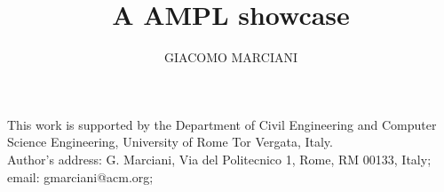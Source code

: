 \documentclass[acmutv-cw-ombd]{acmlarge}
\title{A AMPL showcase}
\author{GIACOMO MARCIANI \affil{University of Rome Tor Vergata}}
\numberwithin{equation}{section}
\begin{document}
\begin{bottomstuff}
	This work is supported by the Department of Civil Engineering and Computer Science
	Engineering, University of Rome Tor Vergata, Italy.\\
	Author's address:
	G. Marciani, Via del Politecnico 1, Rome, RM 00133, Italy;
	email: gmarciani@acm.org;
\end{bottomstuff}

\maketitle








\elecappendix

\end{document}
